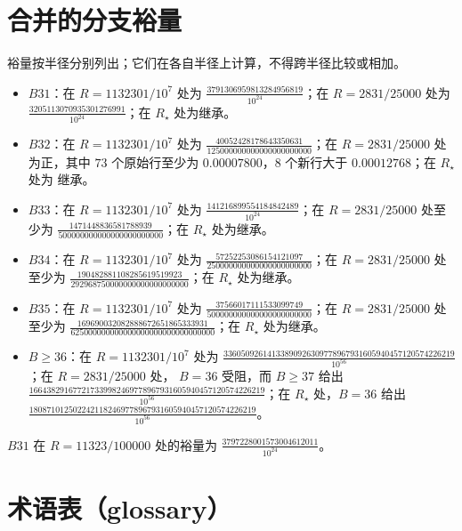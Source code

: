 \section{合并的分支裕量}

裕量按半径分别列出；它们在各自半径上计算，不得跨半径比较或相加。

\begin{itemize}[leftmargin=1.4em,itemsep=2pt]
\item $B31$：在 $R=1132301/10^{7}$ 处为
$\frac{3791306959813284956819}{10^{24}}$；在 $R=2831/25000$ 处为
$\frac{3205113070935301276991}{10^{24}}$；在 $R_\star$ 处为继承。
\item $B32$：在 $R=1132301/10^{7}$ 处为
$\frac{40052428178643350631}{125000000000000000000000}$；在 $R=2831/25000$ 处为正，其中 $73$
个原始行至少为 $0.00007800$，$8$ 个新行大于 $0.00012768$；在 $R_\star$ 处为
继承。
\item $B33$：在 $R=1132301/10^{7}$ 处为
$\frac{141216899554184842489}{10^{24}}$；在 $R=2831/25000$ 处至少为
$\frac{1471448836581788939}{500000000000000000000000}$；在 $R_\star$ 处为继承。
\item $B34$：在 $R=1132301/10^{7}$ 处为
$\frac{57252253086154121097}{250000000000000000000000}$；在 $R=2831/25000$ 处至少为
$\frac{190482881108285619519923}{292968750000000000000000000}$；在 $R_\star$ 处为继承。
\item $B35$：在 $R=1132301/10^{7}$ 处为
$\frac{37566017111533099749}{500000000000000000000000}$；在 $R=2831/25000$ 处至少为
$\frac{169690032082888672651865333931}{625000000000000000000000000000000}$；在 $R_\star$ 处为继承。
\item $B\ge36$：在 $R=1132301/10^{7}$ 处为
$\frac{33605092614133890926309778967931605940457120574226219}{10^{56}}$；在 $R=2831/25000$ 处，
$B=36$ 受阻，而 $B\ge37$ 给出
$\frac{166438291677217339982469778967931605940457120574226219}{10^{56}}$；在 $R_\star$ 处，$B=36$
给出
$\frac{1808710125022421182469778967931605940457120574226219}{10^{56}}$。
\end{itemize}

$B31$ 在 $R=11323/100000$ 处的裕量为 $\frac{3797228001573004612011}{10^{24}}$。


\section{术语表（glossary）}

